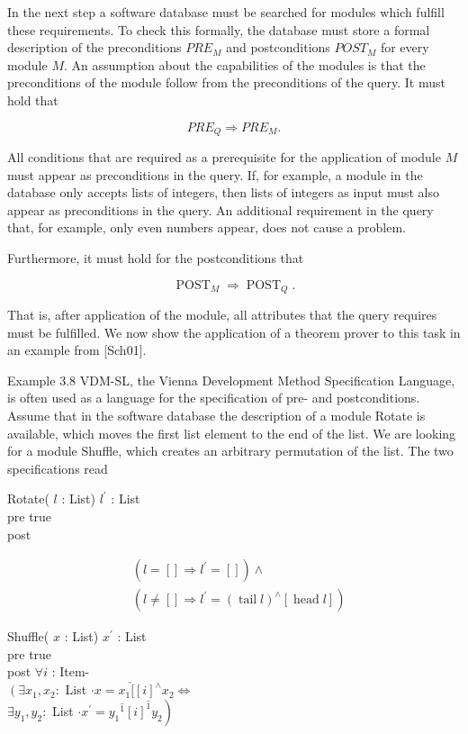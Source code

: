 \documentclass[10pt]{article}
\begin{document}
In the next step a software database must be searched for modules which fulfill these requirements. To check this formally, the database must store a formal description of the preconditions $P R E_{M}$ and postconditions $P O S T_{M}$ for every module $M$. An assumption about the capabilities of the modules is that the preconditions of the module follow from the preconditions of the query. It must hold that

$$
P R E_{Q} \Rightarrow P R E_{M} .
$$

All conditions that are required as a prerequisite for the application of module $M$ must appear as preconditions in the query. If, for example, a module in the database only accepts lists of integers, then lists of integers as input must also appear as preconditions in the query. An additional requirement in the query that, for example, only even numbers appear, does not cause a problem.

Furthermore, it must hold for the postconditions that

$$
\operatorname{POST}_{M} \Rightarrow \operatorname{POST}_{Q} .
$$

That is, after application of the module, all attributes that the query requires must be fulfilled. We now show the application of a theorem prover to this task in an example from [Sch01].

Example 3.8 VDM-SL, the Vienna Development Method Specification Language, is often used as a language for the specification of pre- and postconditions. Assume that in the software database the description of a module Rotate is available, which moves the first list element to the end of the list. We are looking for a module Shuffle, which creates an arbitrary permutation of the list. The two specifications read

Rotate( $l$ : List) $l^{\prime}$ : List\\
pre true\\
post

$$
\begin{aligned}
& \left(l=[] \Rightarrow l^{\prime}=[]\right) \wedge \\
& \left(l \neq[] \Rightarrow l^{\prime}=(\operatorname{tail} l)^{\wedge}[\operatorname{head} l]\right)
\end{aligned}
$$

Shuffle( $x$ : List) $x^{\prime}$ : List\\
pre true\\
post $\forall i$ : Item-\\
$\left(\exists x_{1}, x_{2}:\right.$ List $\cdot x=x_{1} \hat{[ }[i]^{\wedge} x_{2} \Leftrightarrow$\\
$\exists y_{1}, y_{2}:$ List $\left.\cdot x^{\prime}=y_{1}{ }^{\hat{1}}[i]^{\hat{1}} y_{2}\right)$
\end{document}
